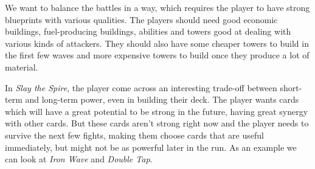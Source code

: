 We want to balance the battles in a way, which requires the player to have strong blueprints with various qualities.
The players should need good economic buildings, fuel-producing buildings, abilities and towers good at dealing with various kinds of attackers.
They should also have some cheaper towers to build in the first few waves and more expensive towers to build once they produce a lot of material.

In \emph{Slay the Spire}, the player come across an interesting trade-off between short-term and long-term power, even in building their deck.
The player wants cards which will have a great potential to be strong in the future, having great synergy with other cards.
But these cards aren't strong right now and the player needs to survive the next few fights, making them choose cards that are useful immediately, but might not be as powerful later in the run.
As an example we can look at \emph{Iron Wave} and \emph{Double Tap}.

